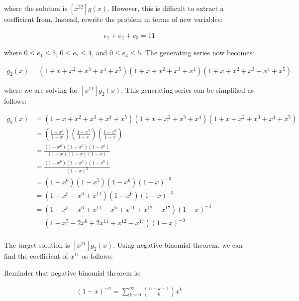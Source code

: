 \documentclass{report}
\begin{document}
{{    where the solution is $[x^22] g(x)$. However, this is difficult to extract
    a coefficient from. Instead, rewrite the problem in terms of new variables:

    \begin{align*}
        e_1 + e_2 + e_3 = 11
    \end{align*}

    where $0 \le e_1 \le 5$, $0 \le e_2 \le 4$, and $0 \le e_3 \le 5$.
    The generating series now becomes:

    \begin{align*}
        g_2(x) = (1 + x + x^2 + x^3 + x^4 + x^5) (1 + x + x^2 + x^3 + x^4) (1 + x + x^2 + x^3 + x^4 + x^5)
    \end{align*}

    where we are solving for $[x^{11}] g_2(x)$. This generating series can be simplified as follows:

    \begin{align*}
        g_2(x) & = (1 + x + x^2 + x^3 + x^4 + x^5) (1 + x + x^2 + x^3 + x^4) (1 + x + x^2 + x^3 + x^4 + x^5) \\
               & = (\frac{1 - x^{6}}{1 - x}) (\frac{1 - x^5}{1 - x}) (\frac{1 - x^6}{1 - x})                 \\
               & = \frac{(1 - x^{6}) (1 - x^5) (1 - x^6)}{(1 - x) (1 - x) (1 - x)}                           \\
               & = \frac{(1 - x^{6}) (1 - x^5) (1 - x^6)}{(1 - x)^3}                                         \\
               & = (1 - x^{6}) (1 - x^5) (1 - x^6) (1-x)^{-3}                                                \\
               & = (1 - x^{5} - x^{6} + x^{11})(1-x^{6}) (1-x)^{-3}                                          \\
               & = (1 - x^{5} - x^{6} + x^{11} - x^{6} + x^{11} + x^{12} - x^{17}) (1-x)^{-3}                \\
               & = (1 - x^{5} - 2x^{6} + 2x^{11} + x^{12} - x^{17}) (1-x)^{-3}                               \\
    \end{align*}

    The target solution is $[x^11] g_2(x)$. Using negative binomial theorem,
    we can find the coefficient of $x^{11}$ as follows:

    Reminder that negative binomial theorem is:

    \begin{align*}
        (1 - x)^{-n} = \sum_{k=0}^{\infty} \binom{n+k-1}{k} x^k
    \end{align*}

}}
\end{document}

